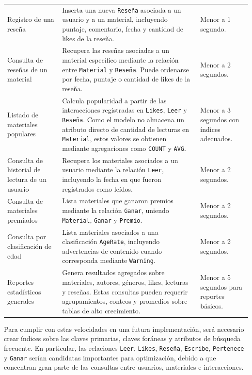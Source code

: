 \documentclass[12pt,a4paper]{article}
\begin{document}
\begin{longtable}{p{4.5cm} p{6.5cm} p{3cm}}
Registro de una reseña & Inserta una nueva \texttt{Reseña} asociada a un usuario y a un material, incluyendo puntaje, comentario, fecha y cantidad de likes de la reseña. & Menor a 1 segundo. \\

Consulta de reseñas de un material & Recupera las reseñas asociadas a un material específico mediante la relación entre \texttt{Material} y \texttt{Reseña}. Puede ordenarse por fecha, puntaje o cantidad de likes de la reseña. & Menor a 2 segundos. \\

Listado de materiales populares & Calcula popularidad a partir de las interacciones registradas en \texttt{Likes}, \texttt{Leer} y \texttt{Reseña}. Como el modelo no almacena un atributo directo de cantidad de lecturas en \texttt{Material}, estos valores se obtienen mediante agregaciones como \texttt{COUNT} y \texttt{AVG}. & Menor a 3 segundos con índices adecuados. \\

Consulta de historial de lectura de un usuario & Recupera los materiales asociados a un usuario mediante la relación \texttt{Leer}, incluyendo la fecha en que fueron registrados como leídos. & Menor a 2 segundos. \\

Consulta de materiales premiados & Lista materiales que ganaron premios mediante la relación \texttt{Ganar}, uniendo \texttt{Material}, \texttt{Ganar} y \texttt{Premio}. & Menor a 2 segundos. \\

Consulta por clasificación de edad & Lista materiales asociados a una clasificación \texttt{AgeRate}, incluyendo advertencias de contenido cuando corresponda mediante \texttt{Warning}. & Menor a 2 segundos. \\

Reportes estadísticos generales & Genera resultados agregados sobre materiales, autores, géneros, likes, lecturas y reseñas. Estas consultas pueden requerir agrupamientos, conteos y promedios sobre tablas de alto crecimiento. & Menor a 5 segundos para reportes básicos. \\

\bottomrule
\end{longtable}

Para cumplir con estas velocidades en una futura implementación, será necesario crear índices sobre las claves primarias, claves foráneas y atributos de búsqueda frecuente. En particular, las relaciones \texttt{Leer}, \texttt{Likes}, \texttt{Reseña}, \texttt{Escribe}, \texttt{Pertenece} y \texttt{Ganar} serían candidatas importantes para optimización, debido a que concentran gran parte de las consultas entre usuarios, materiales e interacciones.
\end{document}
